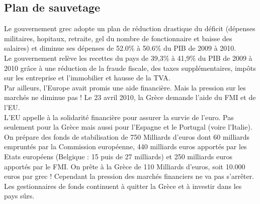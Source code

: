 \subsection{Plan de sauvetage}
Le gouvernement grec adopte un plan de réduction drastique du déficit (dépenses militaires, hopitaux, retraite, gel du nombre de fonctionnaire et baisse des salaires) et diminue ses dépenses de 52.0\% à 50.6\% du PIB de 2009 à 2010. \\
Le gouvernement relève les recettes du pays de 39,3\% à 41,9\% du PIB de 2009 à 2010 grâce à une réduction de la fraude fiscale, des taxes supplémentaires, impôts sur les entreprise et l'immobilier et hausse de la TVA.\\
Par ailleurs, l'Europe avait promis une aide financière. Mais la pression sur les marchés ne diminue pas ! Le 23 avril 2010, la Grèce demande l'aide du FMI et de l'EU.\\
L'EU appelle à la solidarité financière pour assurer la survie de l’euro. Pas seulement pour la Grèce mais aussi pour l’Espagne et le Portugal (voire l'Italie). On prépare des fonds de stabilisation de 750 Milliards d'euros dont 60 milliards empruntés par la Commission européenne, 440 milliards euros apportés par les Etats européens (Belgique : 15 puis de 27 milliards) et 250 milliards euros apportés par le FMI. On prête à la Grèce de 110 Milliards d'euros, soit 10.000 euros par grec ! Cependant la pression des marchés financiers ne va pas s’arrêter. Les gestionnaires de fonds continuent à quitter la Grèce et à investir dans les pays sûrs.

